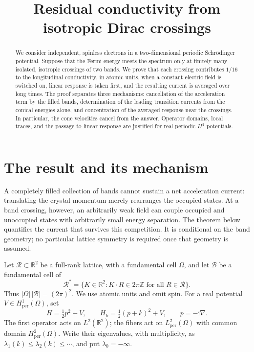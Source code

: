 \documentclass[11pt,a4paper]{article}
\title{Residual conductivity from isotropic Dirac crossings}
\author{}
\date{}
\newcommand{\R}{\mathbb R}
\newcommand{\Z}{\mathbb Z}
\newcommand{\BZ}{\mathcal B}
\newcommand{\lat}{\mathcal R}
\newcommand{\ii}{\mathrm i}
\theoremstyle{remark}
\numberwithin{equation}{section}
\begin{document}
\maketitle
\vspace{-2em}

\begin{abstract}
We consider independent, spinless electrons in a two-dimensional periodic
Schr\"odinger potential. Suppose that the Fermi energy meets the spectrum
only at finitely many isolated, isotropic crossings of two bands.
We prove that each crossing contributes $1/16$ to the longitudinal
conductivity, in atomic units, when a constant electric field is switched
on, linear response is taken first, and the resulting current is averaged
over long times. The proof separates three mechanisms: cancellation of
the acceleration term by the filled bands, determination of the leading
transition currents from the conical energies alone, and concentration
of the averaged response near the crossings. In particular, the cone
velocities cancel from the answer. Operator domains, local traces, and
the passage to linear response are justified for real periodic
$H^1$ potentials.
\end{abstract}

\section{The result and its mechanism}
\label{sec:result}

A completely filled collection of bands cannot sustain a net acceleration
current: translating the crystal momentum merely rearranges the occupied
states. At a band crossing, however, an arbitrarily weak field can couple
occupied and unoccupied states with arbitrarily small energy separation.
The theorem below quantifies the current that survives this competition.
It is conditional on the band geometry; no particular lattice symmetry
is required once that geometry is assumed.

Let $\lat\subset\R^2$ be a full-rank lattice, with a fundamental cell
$\Omega$, and let $\BZ$ be a fundamental cell of
\[
 \lat^*=\{K\in\R^2:K\cdot R\in2\pi\Z\text{ for all }R\in\lat\}.
\]
Thus $|\Omega|\,|\BZ|=(2\pi)^2$. We use atomic units and omit spin.
For a real potential $V\in H^1_{\mathrm{per}}(\Omega)$, set
\begin{equation}
 H=\tfrac12p^2+V,\qquad
 H_k=\tfrac12(p+k)^2+V,\qquad p=-\ii\nabla.
 \label{eq:hamiltonians}
\end{equation}
The first operator acts on $L^2(\R^2)$; the fibers act on
$L^2_{\mathrm{per}}(\Omega)$ with common domain
$H^2_{\mathrm{per}}(\Omega)$. Write their eigenvalues, with multiplicity, as
$\lambda_1(k)\leq\lambda_2(k)\leq\cdots$, and put $\lambda_0=-\infty$.
\end{document}
